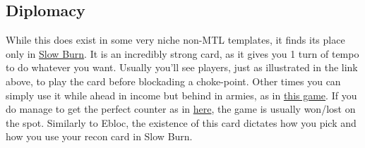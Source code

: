 \subsection{Diplomacy}

While this does exist in some very niche non-MTL templates, it finds its place only in \href{https://www.warzone.com/MultiPlayer?GameID=40253047}{Slow Burn}. It is an incredibly strong card, as it gives you 1 turn of tempo to do whatever you want. Usually you'll see players, just as illustrated in the link above, to play the card before blockading a choke-point. Other times you can simply use it while ahead in income but behind in armies, as in \href{https://www.warzone.com/MultiPlayer?GameID=38423302}{this game}. If you do manage to get the perfect counter as in \href{https://www.warzone.com/MultiPlayer?GameID=41343288}{here}, the game is usually won/lost on the spot. Similarly to Ebloc, the existence of this card dictates how you pick and how you use your recon card in Slow Burn.